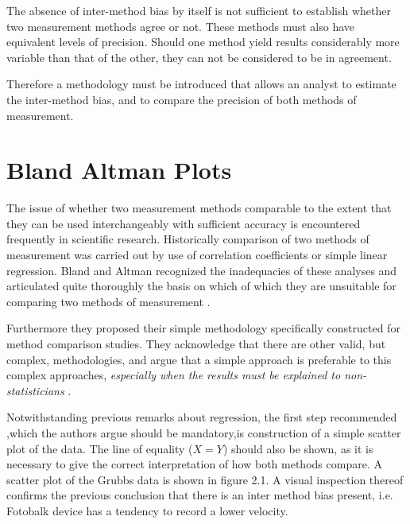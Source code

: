 \documentclass[12pt, a4paper]{report}
\theoremstyle{plain}
\theoremstyle{definition}
\theoremstyle{remark}
\begin{document}
	\bigskip
	
	\noindent The absence of inter-method bias by itself is not
	sufficient to establish whether two measurement methods agree or
	not. These methods must also have equivalent levels of precision.
	Should one method yield results considerably more variable than
	that of the other, they can not be considered to be in agreement.
	
	Therefore a methodology must be introduced that allows an analyst
	to estimate the inter-method bias, and to compare the precision of
	both methods of measurement.
	\newpage
	\section{Bland Altman Plots}
	The issue of whether two measurement methods comparable to the
	extent that they can be used interchangeably with sufficient
	accuracy is encountered frequently in scientific research.
	Historically comparison of two methods of measurement was carried
	out by use of correlation coefficients or simple linear
	regression. Bland and Altman recognized the inadequacies of these
	analyses and articulated quite thoroughly the basis on which of
	which they are unsuitable for comparing two methods of measurement
	\citep*{BA83}.
	
	
	Furthermore they proposed their simple methodology specifically
	constructed for method comparison studies. They acknowledge that
	there are other valid, but complex, methodologies, and argue that
	a simple approach is preferable to this complex approaches,
	\emph{especially when the results must be explained to
		non-statisticians} \citep*{BA83}.
	
	\smallskip
	
	Notwithstanding previous remarks about regression, the first step
	recommended ,which the authors argue should be mandatory,is
	construction of a simple scatter plot of the data. The line of
	equality ($X=Y$) should also be shown, as it is necessary to give
	the correct interpretation of how both methods compare. A scatter
	plot of the Grubbs data is shown in figure 2.1. A visual
	inspection thereof confirms the previous conclusion that there is
	an inter method bias present, i.e. Fotobalk device has a tendency
	to record a lower velocity.
	
\end{document}
